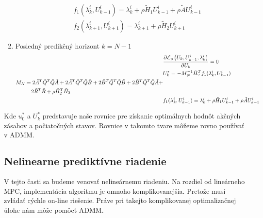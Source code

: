 \begin{enumerate}
{\begin{align}
\begin{split}
			\end{split}\\
			& f_{1}(\lambda_{k}^{i},U_{k-1}^{i}) = \lambda_{k}^{i} + \rho\tilde{H}_{1}U_{k-1}^{i}+\rho\tilde{A}U_{k-1}^{i}\\
			& f_{2}(\lambda_{k+1}^{i},U_{k+1}^{i}) = \lambda_{k+1}^{i} + \rho\tilde{H}_{2}U_{k+1}^{i}
		\end{align}
	}
		\item{Posledný predikčný horizont $k = N-1$\\
		\begin{align}
		&\frac{\partial \mathcal{L}_{\rho}\left(U_{k},U_{k-1}^{i},\lambda_{k}^{i}\right)}{\partial U_{k}} = 0\\
		&U_{k}^{*} = -M_{N}^{-1}\tilde{H}_{2}^{T}f_{1}(\lambda_{k}^{i},U_{k-1}^{i})\\
		\begin{split}
		& M_{N} = 2\tilde{A}^{T}\tilde{Q}^{T}\tilde{Q}\tilde{A}+2\tilde{A}^{T}\tilde{Q}^{T}\tilde{Q}\tilde{B}+2\tilde{B}^{T}\tilde{Q}^{T}\tilde{Q}\tilde{B}+2\tilde{B}^{T}\tilde{Q}^{T}\hat{Q}\tilde{A}+\\
		&\hspace{1.0cm}2\tilde{R}^{T}\tilde{R} + \rho\tilde{H}_{2}^{T}\tilde{H}_{2}
		\end{split}\\
		& f_{1}(\lambda_{k}^{i},U_{k-1}^{i}) = \lambda_{k}^{i} + \rho\tilde{H}_{1}U_{k-1}^{i}+\rho\tilde{A}U_{k-1}^{i}
		\end{align}
	}
\end{enumerate}
Kde $u_{0}^{*}$ a $U_{k}^{*}$ predstavuje naše rovnice pre získanie optimálnych hodnôt akčných zásahov a počiatočných stavov. Rovnice v takomto tvare môžeme rovno používať v ADMM.

\subsection{Nelinearne prediktívne riadenie}
\label{subse:Nelin_MPC_ADMM}
V tejto časti sa budeme venovať nelineárnemu riadeniu. Na rozdiel od lineárneho MPC, implementácia algoritmu je omnoho komplikovanejšia. Pretože musí zvládať rýchle on-line riešenie. Práve pri takejto komplikovanej optimalizačnej úlohe nám môže pomôcť ADMM.

